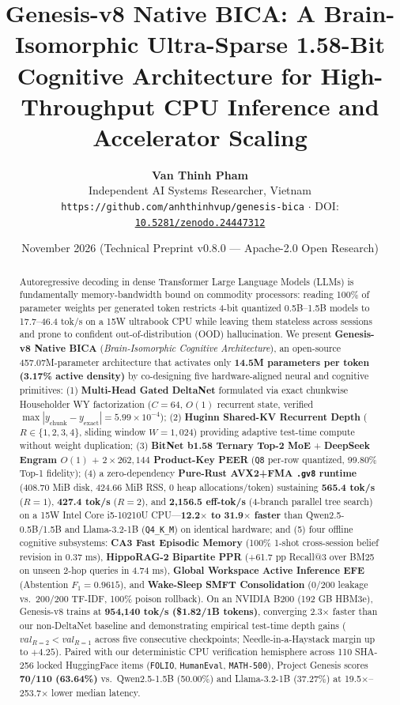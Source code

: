 \documentclass[10pt,twocolumn,letterpaper]{article}
\title{\textbf{Genesis-v8 Native BICA: A Brain-Isomorphic Ultra-Sparse 1.58-Bit Cognitive Architecture for High-Throughput CPU Inference and Accelerator Scaling}}
\author{
  \textbf{Van Thinh Pham} \\
  Independent AI Systems Researcher, Vietnam \\
  \texttt{https://github.com/anhthinhvup/genesis-bica} \quad $\cdot$ \quad DOI: \href{https://doi.org/10.5281/zenodo.24447312}{\texttt{10.5281/zenodo.24447312}}
}
\date{November 2026 \quad (Technical Preprint v0.8.0 --- Apache-2.0 Open Research)}
\begin{document}
\maketitle

\begin{abstract}
Autoregressive decoding in dense Transformer Large Language Models (LLMs) is fundamentally memory-bandwidth bound on commodity processors: reading 100\% of parameter weights per generated token restricts 4-bit quantized 0.5B--1.5B models to 17.7--46.4 tok/s on a 15W ultrabook CPU while leaving them stateless across sessions and prone to confident out-of-distribution (OOD) hallucination. We present \textbf{Genesis-v8 Native BICA} (\emph{Brain-Isomorphic Cognitive Architecture}), an open-source 457.07M-parameter architecture that activates only \textbf{14.5M parameters per token (3.17\% active density)} by co-designing five hardware-aligned neural and cognitive primitives: (1) \textbf{Multi-Head Gated DeltaNet} formulated via exact chunkwise Householder WY factorization ($C=64$, $O(1)$ recurrent state, verified $\max |y_{\text{chunk}}-y_{\text{exact}}| = 5.99\times 10^{-4}$); (2) \textbf{Huginn Shared-KV Recurrent Depth} ($R\in\{1,2,3,4\}$, sliding window $W=1{,}024$) providing adaptive test-time compute without weight duplication; (3) \textbf{BitNet b1.58 Ternary Top-2 MoE} + \textbf{DeepSeek Engram $O(1)$} + \textbf{$2\times 262{,}144$ Product-Key PEER} (\texttt{Q8} per-row quantized, 99.80\% Top-1 fidelity); (4) a zero-dependency \textbf{Pure-Rust AVX2+FMA \texttt{.gv8} runtime} (408.70 MiB disk, 424.66 MiB RSS, 0 heap allocations/token) sustaining \textbf{565.4 tok/s} ($R=1$), \textbf{427.4 tok/s} ($R=2$), and \textbf{2,156.5 eff-tok/s} (4-branch parallel tree search) on a 15W Intel Core i5-10210U CPU---\textbf{12.2$\times$ to 31.9$\times$ faster} than Qwen2.5-0.5B/1.5B and Llama-3.2-1B (\texttt{Q4\_K\_M}) on identical hardware; and (5) four offline cognitive subsystems: \textbf{CA3 Fast Episodic Memory} (100\% 1-shot cross-session belief revision in 0.37 ms), \textbf{HippoRAG-2 Bipartite PPR} (+61.7 pp Recall@3 over BM25 on unseen 2-hop queries in 4.74 ms), \textbf{Global Workspace Active Inference EFE} (Abstention $F_1=0.9615$), and \textbf{Wake-Sleep SMFT Consolidation} (0/200 leakage vs.\ 200/200 TF-IDF, 100\% poison rollback). On an NVIDIA B200 (192 GB HBM3e), Genesis-v8 trains at \textbf{954,140 tok/s (\$1.82/1B tokens)}, converging 2.3$\times$ faster than our non-DeltaNet baseline and demonstrating empirical test-time depth gains ($val_{R=2} < val_{R=1}$ across five consecutive checkpoints; Needle-in-a-Haystack margin up to $+4.25$). Paired with our deterministic CPU verification hemisphere across 110 SHA-256 locked HuggingFace items (\texttt{FOLIO}, \texttt{HumanEval}, \texttt{MATH-500}), Project Genesis scores \textbf{70/110 (63.64\%)} vs.\ Qwen2.5-1.5B (50.00\%) and Llama-3.2-1B (37.27\%) at 19.5$\times$--253.7$\times$ lower median latency.
\end{abstract}
\end{document}
